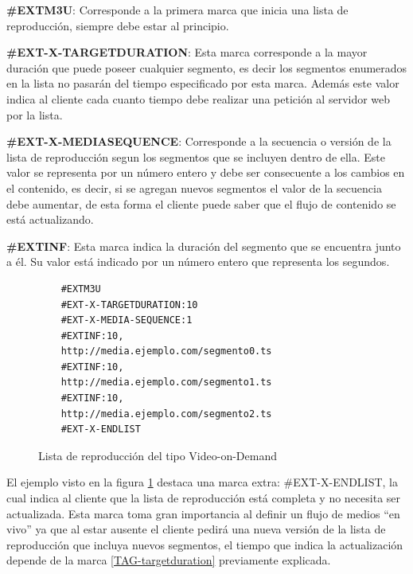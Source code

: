 \begin{prop}

\item \textbf{\#EXTM3U}: Corresponde a la primera marca que inicia una lista de reproducción, siempre debe estar al principio.

\item \textbf{\#EXT-X-TARGETDURATION}: Esta marca corresponde a la mayor duración que puede poseer cualquier segmento, es decir los segmentos enumerados en la lista no pasarán del tiempo especificado por esta marca.
Además este valor indica al cliente cada cuanto tiempo debe realizar una petición al servidor web por la lista.
\label{TAG-targetduration}

\item \label{TAG-mediasequence} \textbf{\#EXT-X-MEDIASEQUENCE}: Corresponde a la secuencia o versión de la lista de reproducción segun los segmentos que se incluyen dentro de ella. Este valor se representa por un número entero y debe ser consecuente a los cambios en el contenido, es decir, si se agregan nuevos segmentos el valor de la secuencia debe aumentar, de esta forma el cliente puede saber que el flujo de contenido se está actualizando.


\item \label{TAG-extinfint} \textbf{\#EXTINF}: Esta marca indica la duración del segmento que se encuentra junto a él. Su valor está indicado por un número entero que representa los segundos.\\
\end{prop}

\begin{figure}[H]
	\centering
	\begin{lstlisting}
	#EXTM3U
	#EXT-X-TARGETDURATION:10
	#EXT-X-MEDIA-SEQUENCE:1
	#EXTINF:10,
	http://media.ejemplo.com/segmento0.ts
	#EXTINF:10,
	http://media.ejemplo.com/segmento1.ts
	#EXTINF:10,
	http://media.ejemplo.com/segmento2.ts
	#EXT-X-ENDLIST
	\end{lstlisting}
	\caption{Lista de reproducción del tipo Video-on-Demand}
	\label{ejemploM3U8}	
\end{figure}			

El ejemplo visto en la figura \ref{ejemploM3U8} destaca una marca extra: \#EXT-X-ENDLIST, la cual indica al cliente que la lista de reproducción está completa y no necesita ser actualizada. Esta marca toma gran importancia al definir un flujo de medios ``en vivo'' ya que al estar ausente el cliente pedirá una nueva versión de la lista de reproducción que incluya nuevos segmentos, el tiempo que indica la actualización depende de la marca \ref{TAG-targetduration} previamente explicada.\\

